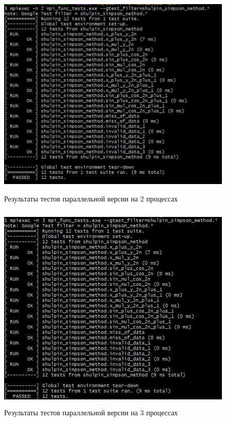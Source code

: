 \documentclass[12pt,a4paper]{article}
\begin{document}
\begin{figure}[H]
\centering
\includegraphics[height=10cm]{img/2nmpitest.jpg}
\caption{\label{fig:visualClass} Результаты тестов параллельной версии на 2 процессах}
\end{figure}

\begin{figure}[H]
\centering
\includegraphics[height=10cm]{img/3nmpitest.jpg}
\caption{\label{fig:visualClass} Результаты тестов параллельной версии на 3 процессах}
\end{figure}
\end{document}
